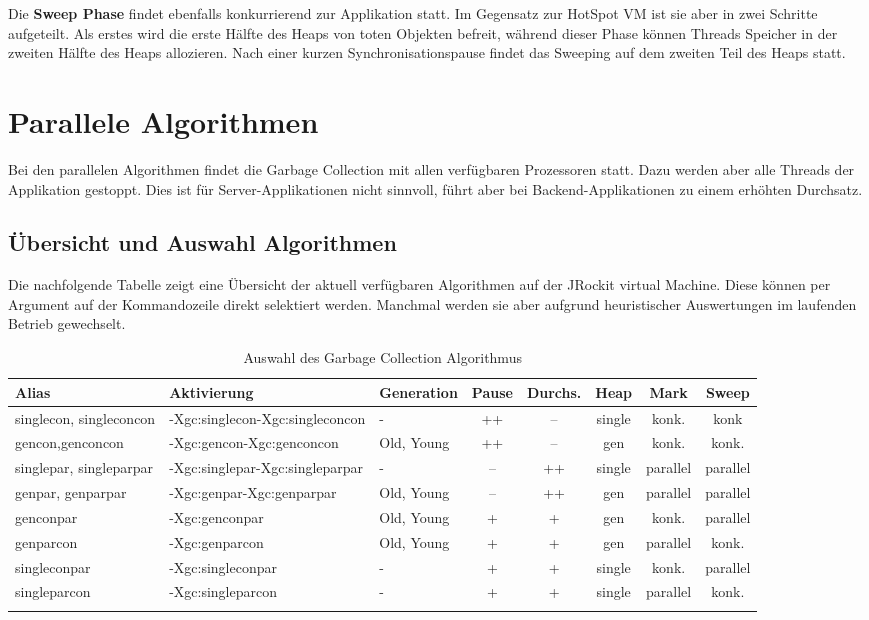 Die \textbf{Sweep Phase} findet ebenfalls konkurrierend zur Applikation statt. Im Gegensatz zur HotSpot VM ist sie aber in zwei Schritte aufgeteilt. Als erstes wird die erste Hälfte des Heaps von toten Objekten befreit, während dieser Phase können Threads Speicher in der zweiten Hälfte des Heaps allozieren. Nach einer kurzen Synchronisationspause findet das Sweeping auf dem zweiten Teil des Heaps statt.

\section{Parallele Algorithmen}
Bei den parallelen Algorithmen findet die Garbage Collection mit allen verfügbaren Prozessoren statt. Dazu werden aber alle Threads der Applikation gestoppt. Dies ist für Server-Applikationen nicht sinnvoll, führt aber bei Backend-Applikationen zu einem erhöhten Durchsatz.

\subsection{Übersicht und Auswahl Algorithmen}\label{auswahl_algorithmen}
Die nachfolgende Tabelle zeigt eine Übersicht der aktuell verfügbaren Algorithmen auf der JRockit virtual Machine. Diese können per Argument auf der Kommandozeile direkt selektiert werden. Manchmal werden sie aber aufgrund heuristischer Auswertungen im laufenden Betrieb gewechselt.
  \begin{longtable}{|p{2cm}|p{2.8cm}|l|c|c|c|c|c|}
    \hline
  \textbf{Alias} & \textbf{Aktivierung}& \textbf{Generation} & \textbf{Pause} &\textbf{Durchs.} & \textbf{Heap} & \textbf{Mark} & \textbf{Sweep} \\\hline
  singlecon, singleconcon & -Xgc:singlecon\newline-Xgc:singleconcon& - &++&--& single & konk. & konk\\\hline

  gencon,\newline genconcon& -Xgc:gencon\newline-Xgc:genconcon &Old, Young&++&-- & gen & konk. & konk.\\\hline	
 
  singlepar, \newline singleparpar& -Xgc:singlepar\newline-Xgc:singleparpar & - & -- & ++ & single & parallel & parallel \\\hline
  genpar, \newline genparpar& -Xgc:genpar\newline-Xgc:genparpar & Old, Young & -- & ++ & gen& parallel & parallel \\\hline
  genconpar &-Xgc:genconpar&Old, Young&+&+&gen& konk. & parallel \\\hline
  genparcon &-Xgc:genparcon&Old, Young&+&+&gen& parallel & konk. \\\hline
  singleconpar &-Xgc:singleconpar&-&+&+&single&konk. & parallel \\\hline
  singleparcon& -Xgc:singleparcon&-&+&+&single&parallel & konk. \\\hline
\caption{Auswahl des Garbage Collection Algorithmus}
  \end{longtable}

